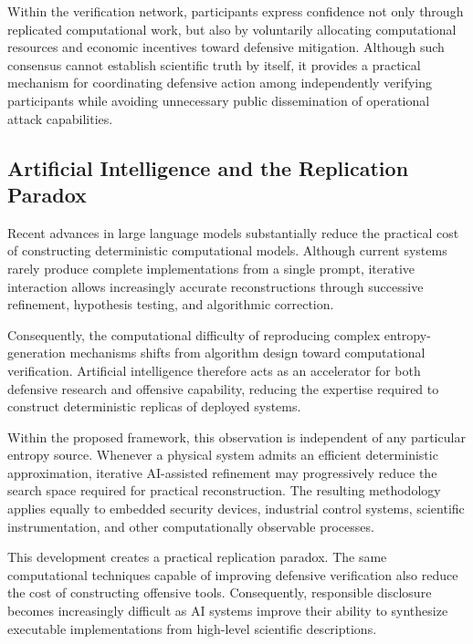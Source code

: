 \documentclass[11pt]{article}
\begin{document}
Within the verification network,
participants express confidence not only through replicated
computational work,
but also by voluntarily allocating computational resources and
economic incentives toward defensive mitigation.
Although such consensus cannot establish scientific truth by itself,
it provides a practical mechanism for coordinating defensive action
among independently verifying participants while avoiding unnecessary
public dissemination of operational attack capabilities.


\subsection{Artificial Intelligence and the Replication Paradox}

Recent advances in large language models substantially reduce the
practical cost of constructing deterministic computational models.
Although current systems rarely produce complete implementations from
a single prompt, iterative interaction allows increasingly accurate
reconstructions through successive refinement, hypothesis testing, and
algorithmic correction.

Consequently, the computational difficulty of reproducing complex
entropy-generation mechanisms shifts from algorithm design toward
computational verification.
Artificial intelligence therefore acts as an accelerator for both
defensive research and offensive capability, reducing the expertise
required to construct deterministic replicas of deployed systems.

Within the proposed framework, this observation is independent of any
particular entropy source.
Whenever a physical system admits an efficient deterministic
approximation, iterative AI-assisted refinement may progressively
reduce the search space required for practical reconstruction.
The resulting methodology applies equally to embedded security
devices, industrial control systems, scientific instrumentation, and
other computationally observable processes.

This development creates a practical replication paradox.
The same computational techniques capable of improving defensive
verification also reduce the cost of constructing offensive tools.
Consequently, responsible disclosure becomes increasingly difficult as
AI systems improve their ability to synthesize executable
implementations from high-level scientific descriptions.
\end{document}

